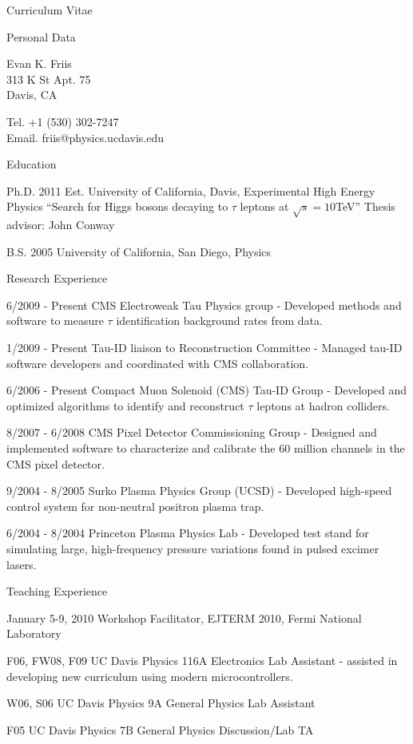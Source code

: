 \documentclass[12pt]{amsart}
\title{}
\author{}
\date{} %
\begin{document}
\nobibliography*
\begin{cv}{Curriculum Vitae}

\begin{cvlist}{Personal Data}
\item Evan K. Friis\\
313 K St Apt. 75\\
Davis, CA

\item Tel. +1 (530) 302-7247\\
Email. friis@physics.ucdavis.edu
\end{cvlist}

\begin{cvlist}{Education}
\item[Ph.D. 2011 Est.] University of California, Davis, Experimental High Energy Physics 
   ``Search for Higgs bosons decaying to $\tau$ leptons at $\sqrt s = 10$TeV'' Thesis advisor: John Conway
\item[B.S. 2005] University of California, San Diego, Physics
\end{cvlist}

\begin{cvlist}{Research Experience}
\item[6/2009 - Present] CMS Electroweak Tau Physics group - Developed methods and software to measure $\tau$ identification background rates from data.
\item[1/2009 - Present] Tau-ID liaison to Reconstruction Committee - Managed tau-ID software developers and coordinated with CMS collaboration.
\item[6/2006 - Present] Compact Muon Solenoid (CMS) Tau-ID Group - Developed and optimized algorithms to identify and reconstruct $\tau$ leptons at hadron colliders.
\item[8/2007 - 6/2008] CMS Pixel Detector Commissioning Group - Designed and implemented software to characterize and calibrate the 60 million channels in the CMS pixel detector.
\item[9/2004 - 8/2005] Surko Plasma Physics Group (UCSD) - Developed high-speed control system for non-neutral positron plasma trap.
\item[6/2004 - 8/2004] Princeton Plasma Physics Lab - Developed test stand for simulating large, high-frequency pressure variations found in pulsed excimer lasers.
\end{cvlist}

\begin{cvlist}{Teaching Experience}
\item[January 5-9, 2010] Workshop Facilitator, EJTERM 2010, Fermi National Laboratory
\item[F06, FW08, F09] UC Davis Physics 116A Electronics Lab Assistant -
   assisted in developing new curriculum using modern microcontrollers.
\item[W06, S06] UC Davis Physics 9A General Physics Lab Assistant
\item[F05] UC Davis Physics 7B General Physics Discussion/Lab TA
\end{cvlist}


\end{cv}
\end{document}

